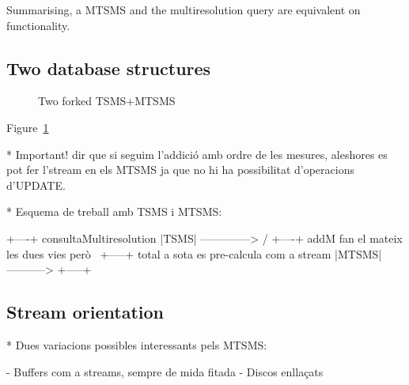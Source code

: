 Summarising, a MTSMS and the multiresolution query are equivalent on
functionality.



\subsection{Two database structures}




\begin{figure}
  \centering
  
  \caption{Two forked TSMS+MTSMS}
  \label{fig:model:mtsms-tsms}
\end{figure}


Figure~\ref{fig:model:mtsms-tsms}


* Important! dir que si seguim l'addició amb ordre de les mesures, aleshores es pot fer l'stream en els MTSMS ja que no hi ha possibilitat d'operacions d'UPDATE.

\todo{}
* Esquema de treball amb TSMS i MTSMS:


        +----+  consultaMultiresolution
        |TSMS| --------------> 
     /  +----+
addM                              fan el mateix les dues vies però
     \  +-----+  total            a sota es pre-calcula com a stream
        |MTSMS| -----------> 
        +-----+





\subsection{Stream orientation}

\todo{}
* Dues variacions possibles interessants pels MTSMS:

 
  - Buffers com a streams, sempre de mida fitada 
  - Discos enllaçats












